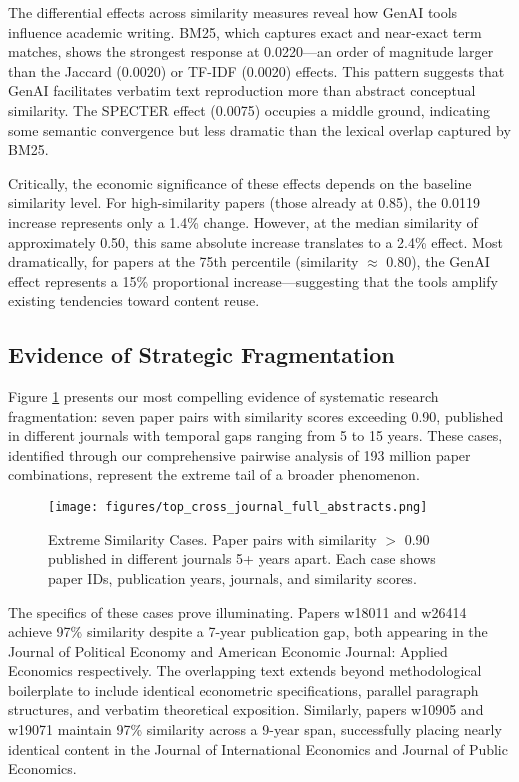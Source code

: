\documentclass[12pt]{article}
\begin{document}
The differential effects across similarity measures reveal how GenAI tools influence academic writing. BM25, which captures exact and near-exact term matches, shows the strongest response at 0.0220—an order of magnitude larger than the Jaccard (0.0020) or TF-IDF (0.0020) effects. This pattern suggests that GenAI facilitates verbatim text reproduction more than abstract conceptual similarity. The SPECTER effect (0.0075) occupies a middle ground, indicating some semantic convergence but less dramatic than the lexical overlap captured by BM25.

Critically, the economic significance of these effects depends on the baseline similarity level. For high-similarity papers (those already at 0.85), the 0.0119 increase represents only a 1.4\% change. However, at the median similarity of approximately 0.50, this same absolute increase translates to a 2.4\% effect. Most dramatically, for papers at the 75th percentile (similarity $\approx$ 0.80), the GenAI effect represents a 15\% proportional increase—suggesting that the tools amplify existing tendencies toward content reuse.

\subsection{Evidence of Strategic Fragmentation}

Figure \ref{fig:extreme_cases} presents our most compelling evidence of systematic research fragmentation: seven paper pairs with similarity scores exceeding 0.90, published in different journals with temporal gaps ranging from 5 to 15 years. These cases, identified through our comprehensive pairwise analysis of 193 million paper combinations, represent the extreme tail of a broader phenomenon.

\begin{figure}[htbp]
\centering
\texttt{[image: figures/top\_cross\_journal\_full\_abstracts.png]}
\caption{Extreme Similarity Cases. Paper pairs with similarity $>$ 0.90 published in different journals 5+ years apart. Each case shows paper IDs, publication years, journals, and similarity scores.}
\label{fig:extreme_cases}
\end{figure}

The specifics of these cases prove illuminating. Papers w18011 and w26414 achieve 97\% similarity despite a 7-year publication gap, both appearing in the Journal of Political Economy and American Economic Journal: Applied Economics respectively. The overlapping text extends beyond methodological boilerplate to include identical econometric specifications, parallel paragraph structures, and verbatim theoretical exposition. Similarly, papers w10905 and w19071 maintain 97\% similarity across a 9-year span, successfully placing nearly identical content in the Journal of International Economics and Journal of Public Economics.
\end{document}
